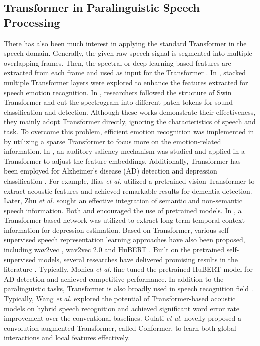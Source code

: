 \documentclass[lettersize,journal]{IEEEtran}
\begin{document}
\subsection{Transformer in Paralinguistic Speech Processing}
There has also been much interest in applying the standard Transformer in the speech domain. Generally, the given raw speech signal is segmented into multiple overlapping frames. Then, the spectral or deep learning-based features are extracted from each frame and used as input for the Transformer \cite{speech_use_trans3, speech_use_trans2, ksT, speech_use_trans1}. In \cite{speech_use_trans2}, stacked multiple Transformer layers were explored to enhance the features extracted for speech emotion recognition. In \cite{speech_use_trans3}, researchers followed the structure of Swin Transformer \cite{Swin} and cut the spectrogram into different patch tokens for sound classification and detection. Although these works demonstrate their effectiveness, they mainly adopt Transformer directly, ignoring the characteristics of speech and task. To overcome this problem, efficient emotion recognition was implemented in \cite{ksT} by utilizing a sparse Transformer to focus more on the emotion-related information. In \cite{Saliency}, an auditory saliency mechanism was studied and applied in a Transformer to adjust the feature embeddings. Additionally, Transformer has been employed for Alzheimer's disease (AD) detection \cite{ad_trans1, ad_trans2} and depression classification \cite{depression_trans1}. For example, Ilias \textit{et al.} \cite{ad_trans1} utilized a pretrained vision Transformer \cite{ViT} to extract acoustic features and achieved remarkable results for dementia detection. Later, Zhu \textit{et al.} \cite{ad_trans2} sought an effective integration of semantic and non-semantic speech information. Both \cite{ad_trans1} and \cite{ad_trans2} encouraged the use of pretrained models. In \cite{depression_trans1}, a Transformer-based network was utilized to extract long-term temporal context information for depression estimation. Based on Transformer, various self-supervised speech representation learning approaches have also been proposed, including wav2vec \cite{wav2vec}, wav2vec 2.0 \cite{wav2vec2} and HuBERT \cite{hubert}. Built on the pretrained self-supervised models, several researches have delivered promising results in the literature \cite{CA-MSER, Monica, reviewer3_1, ksT, ad_trans2, speechformer, sota_w2v2_daic_1, sota_w2v2_meld_1}. Typically, Monica \textit{et al.} \cite{Monica} fine-tuned the pretrained HuBERT model for AD detection and achieved competitive performance. In addition to the paralinguistic tasks, Transformer is also broadly used in speech recognition field \cite{TaoJianhua_asr, reviewer2_2, reviewer2_1}. Typically, Wang \textit{et al.} \cite{reviewer2_2} explored the potential of Transformer-based acoustic models on hybrid speech recognition and achieved significant word error rate improvement over the conventional baselines. Gulati \textit{et al.} \cite{reviewer2_1} novelly proposed a convolution-augmented Transformer, called Conformer, to learn both global interactions and local features effectively. 
\end{document}
